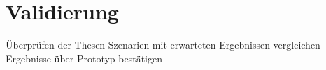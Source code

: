 \chapter{Validierung}
Überprüfen der Thesen
    Szenarien mit erwarteten Ergebnissen vergleichen
    Ergebnisse über Prototyp bestätigen
